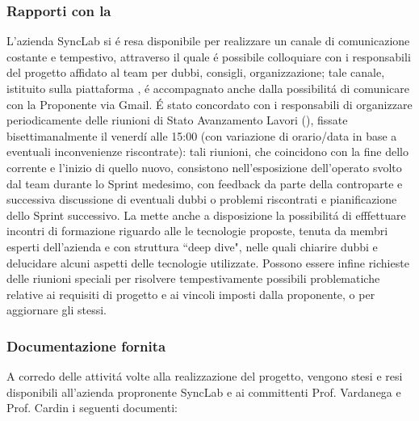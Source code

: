 \subsubsection{Rapporti con la }
L'azienda SyncLab si é resa disponibile per realizzare un canale di comunicazione costante e tempestivo, attraverso il quale é possibile colloquiare con i responsabili del progetto affidato al team per dubbi, consigli, organizzazione; tale canale, istituito sulla piattaforma , é accompagnato anche dalla possibilitá di comunicare con la Proponente via Gmail. É stato concordato con i responsabili di organizzare periodicamente delle riunioni di Stato Avanzamento Lavori (), fissate bisettimanalmente il venerdí alle 15:00 (con variazione di orario/data in base a eventuali inconvenienze riscontrate): tali riunioni, che coincidono con la fine dello  corrente e l'inizio di quello nuovo, consistono nell'esposizione dell'operato svolto dal team durante lo Sprint medesimo, con feedback da parte della controparte e successiva discussione di eventuali dubbi o problemi riscontrati e pianificazione dello Sprint successivo.
La  mette anche a disposizione la possibilitá di efffettuare incontri di formazione riguardo alle le tecnologie proposte, tenuta da membri esperti dell'azienda e con struttura ``deep dive", nelle quali chiarire dubbi e delucidare alcuni aspetti delle tecnologie utilizzate. 
Possono essere infine richieste delle riunioni speciali per risolvere tempestivamente possibili problematiche relative ai requisiti di progetto e ai vincoli imposti dalla proponente, o per aggiornare gli stessi.

\subsubsection{Documentazione fornita}
A corredo delle attivitá volte alla realizzazione del progetto, vengono stesi e resi disponibili all'azienda propronente SyncLab e ai committenti Prof. Vardanega e Prof. Cardin i seguenti documenti:


